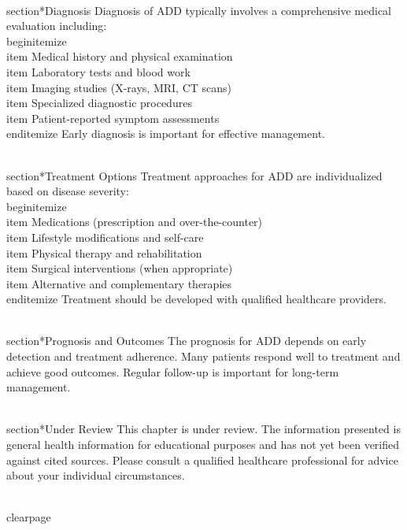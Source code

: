 \\section*{Diagnosis}
Diagnosis of ADD typically involves a comprehensive medical evaluation including:
\\begin{itemize}
  \\item Medical history and physical examination
  \\item Laboratory tests and blood work
  \\item Imaging studies (X-rays, MRI, CT scans)
  \\item Specialized diagnostic procedures
  \\item Patient-reported symptom assessments
\\end{itemize}
Early diagnosis is important for effective management.

\\section*{Treatment Options}
Treatment approaches for ADD are individualized based on disease severity:
\\begin{itemize}
  \\item Medications (prescription and over-the-counter)
  \\item Lifestyle modifications and self-care
  \\item Physical therapy and rehabilitation
  \\item Surgical interventions (when appropriate)
  \\item Alternative and complementary therapies
\\end{itemize}
Treatment should be developed with qualified healthcare providers.

\\section*{Prognosis and Outcomes}
The prognosis for ADD depends on early detection and treatment adherence. Many patients respond well to treatment and achieve good outcomes. Regular follow-up is important for long-term management.

\\section*{Under Review}
This chapter is under review. The information presented is general health information for educational purposes and has not yet been verified against cited sources. Please consult a qualified healthcare professional for advice about your individual circumstances.

\\clearpage
